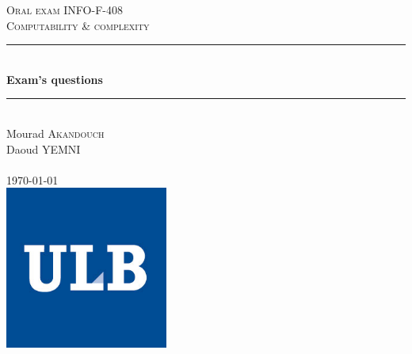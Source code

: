 \begin{titlepage}

\newcommand{\HRule}{\rule{\linewidth}{0.5mm}} %

\center %
 

\textsc{\Large Oral exam INFO-F-408}\\[0.5cm] %
\textsc{\large Computability \& complexity}\\[0.5cm] %

\HRule \\[0.4cm]
{ \huge \bfseries Exam's questions}\\[0.4cm] %
\HRule \\[1.5cm]
 
Mourad \textsc{Akandouch}\\[0cm] %
Daoud  \textsc{YEMNI    }\\[0cm] %
       \textsc{         }\\[2cm] %
{\large \today}\\[3cm] %

\includegraphics[width=0.4\textwidth]{logo.jpg}\\[1cm] %
\end{titlepage}

